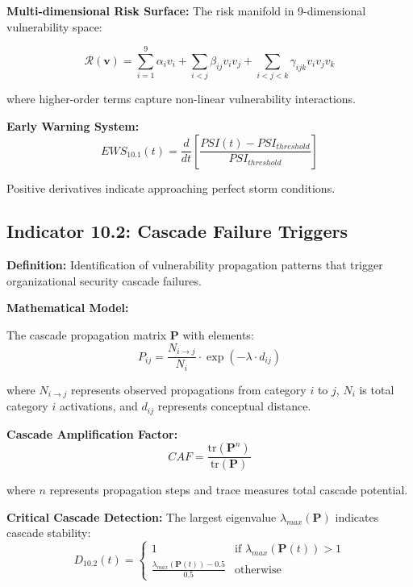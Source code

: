 \documentclass[11pt,a4paper]{article}
\begin{document}
\textbf{Multi-dimensional Risk Surface:}
The risk manifold in 9-dimensional vulnerability space:

\begin{equation}
\mathcal{R}(\mathbf{v}) = \sum_{i=1}^{9} \alpha_i v_i + \sum_{i<j} \beta_{ij} v_i v_j + \sum_{i<j<k} \gamma_{ijk} v_i v_j v_k
\end{equation}

where higher-order terms capture non-linear vulnerability interactions.

\textbf{Early Warning System:}
\begin{equation}
EWS_{10.1}(t) = \frac{d}{dt}\left[\frac{PSI(t) - PSI_{threshold}}{PSI_{threshold}}\right]
\end{equation}

Positive derivatives indicate approaching perfect storm conditions.

\subsection{Indicator 10.2: Cascade Failure Triggers}

\textbf{Definition:} Identification of vulnerability propagation patterns that trigger organizational security cascade failures.

\textbf{Mathematical Model:}

The cascade propagation matrix $\mathbf{P}$ with elements:
\begin{equation}
P_{ij} = \frac{N_{i \rightarrow j}}{N_i} \cdot \exp(-\lambda \cdot d_{ij})
\end{equation}

where $N_{i \rightarrow j}$ represents observed propagations from category $i$ to $j$, $N_i$ is total category $i$ activations, and $d_{ij}$ represents conceptual distance.

\textbf{Cascade Amplification Factor:}
\begin{equation}
CAF = \frac{\text{tr}(\mathbf{P}^n)}{\text{tr}(\mathbf{P})}
\end{equation}

where $n$ represents propagation steps and trace measures total cascade potential.

\textbf{Critical Cascade Detection:}
The largest eigenvalue $\lambda_{max}(\mathbf{P})$ indicates cascade stability:
\begin{equation}
D_{10.2}(t) = \begin{cases}
1 & \text{if } \lambda_{max}(\mathbf{P}(t)) > 1 \\
\frac{\lambda_{max}(\mathbf{P}(t)) - 0.5}{0.5} & \text{otherwise}
\end{cases}
\end{equation}
\end{document}
